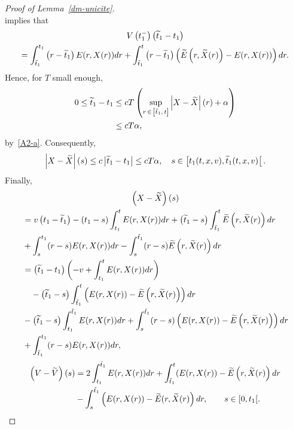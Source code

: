 \documentclass[10pt]{amsart}
\theoremstyle{definition}\newtheorem{defi}[theo]{Definition}\newtheorem{rema}[theo]{Remark}\newtheorem{exam}[theo]{Example}\newtheorem{exem}[theo]{Example}\newtheorem{nota}[theo]{Notation}
\let\oldtilde\tilde
\renewcommand*{\tilde}[1]{\mathchoice{\widetilde{#1}}{\widetilde{#1}}{\oldtilde{#1}}{\oldtilde{#1}}}
\begin{document}
\begin{proof}[{Proof of Lemma~\ref{dm-unicite}}]
\[\]
implies that
\begin{multline*}
V\left(t_1^-\right)\left(\tilde{t}_1-t_1\right)\\
= \int_{\tilde{t}_1}^{t_1} \left(r-\tilde{t}_1\right)E(r,X(r))dr + \int_{\tilde{t}_1}^t \left(r-\tilde{t}_1\right) \left(\tilde{E}\left(r,\tilde{X}(r)\right)-E(r,X(r)) \right) dr.
\end{multline*}
Hence, for $T$ small enough,
\begin{equation}\label{t1-tTilde1}
\begin{split}
0\leq \tilde{t}_1-t_1&\leq cT\left(\sup_{r\,\in\, \left[\tilde{t}_1,\,t\right]} \left|X-\tilde{X}\right|(r)+\alpha \right) \\
&\leq cT\alpha,
\end{split}
\end{equation}
by~\eqref{A2-a}. Consequently,
\begin{equation}\label{A2-c}
\left|X-\tilde{X}\right|(s) \leq c\left|\tilde{t}_1-t_1\right| \leq cT\alpha, \quad s \in \left[t_1(t,x,v),\tilde{t}_1(t,x,v)\right[.
\end{equation}
Finally,
\begin{multline*}
\left(X-\tilde{X}\right)(s)\\
\begin{aligned}
&= v\left(t_1-\tilde{t}_1\right)-(t_1-s)\int_{t_1}^t E(r,X(r))dr + \left(\tilde{t}_1-s\right)\int_{\tilde{t}_1}^t \tilde{E}\left(r,\tilde{X}(r)\right)dr \\
&+\int_s^{t_1} (r-s) E(r,X(r))dr - \int_s^{\tilde{t}_1} (r-s)\tilde{E}\left(r,\tilde{X}(r)\right)dr\\
&= \left(\tilde{t}_1-t_1\right) \left(-v + \int_{t_1}^t E(r,X(r))dr \right)\\
&\quad-\left(\tilde{t}_1-s\right) \int_{\tilde{t}_1}^t \left (E(r,X(r))-\tilde{E}\left(r,\tilde{X}(r)\right) \right) dr \\
&- \left(\tilde{t}_1-s\right) \int_{t_1}^{\tilde{t}_1} E(r,X(r)) dr + \int_s^{\tilde{t}_1} (r-s) \left(E(r,X(r))-\tilde{E}\left(r,\tilde{X}(r)\right) \right) dr \\
&+ \int_{\tilde{t}_1}^{t_1} (r-s)E(r,X(r)) dr,
\end{aligned}
\end{multline*}
\begin{align*}
\left(V-\tilde{V}\right)(s) &= 2\int_{t_1}^{\tilde{t}_1} E(r,X(r)) dr + \int_{\tilde{t}_1}^t (E(r,X(r))-\tilde{E}\left(r,\tilde{X}(r) \right) dr \\
&- \int_s^{\tilde{t}_1} \left (E(r,X(r))-\tilde{E}(r,\tilde{X}(r) \right) dr, \qquad s \in [0,t_1[.

\end{align*}
\end{proof}
\end{document}
